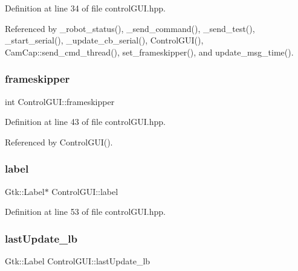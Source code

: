Definition at line 34 of file control\+G\+U\+I.\+hpp.



Referenced by \+\_\+robot\+\_\+status(), \+\_\+send\+\_\+command(), \+\_\+send\+\_\+test(), \+\_\+start\+\_\+serial(), \+\_\+update\+\_\+cb\+\_\+serial(), Control\+G\+U\+I(), Cam\+Cap\+::send\+\_\+cmd\+\_\+thread(), set\+\_\+frameskipper(), and update\+\_\+msg\+\_\+time().

\mbox{\label{class_control_g_u_i_affcb5dec02b4556795f4f709a6e81b25}} 
\subsubsection{\texorpdfstring{frameskipper}{frameskipper}}
{\footnotesize\ttfamily int Control\+G\+U\+I\+::frameskipper}



Definition at line 43 of file control\+G\+U\+I.\+hpp.



Referenced by Control\+G\+U\+I().

\mbox{\label{class_control_g_u_i_a225d9b556218b679235d3bca6c464415}} 
\subsubsection{\texorpdfstring{label}{label}}
{\footnotesize\ttfamily Gtk\+::\+Label$\ast$ Control\+G\+U\+I\+::label}



Definition at line 53 of file control\+G\+U\+I.\+hpp.

\mbox{\label{class_control_g_u_i_afe6bb1a7eb11e33cfa1fe089c4bfcd2d}} 
\subsubsection{\texorpdfstring{last\+Update\+\_\+lb}{lastUpdate\_lb}}
{\footnotesize\ttfamily Gtk\+::\+Label Control\+G\+U\+I\+::last\+Update\+\_\+lb}



